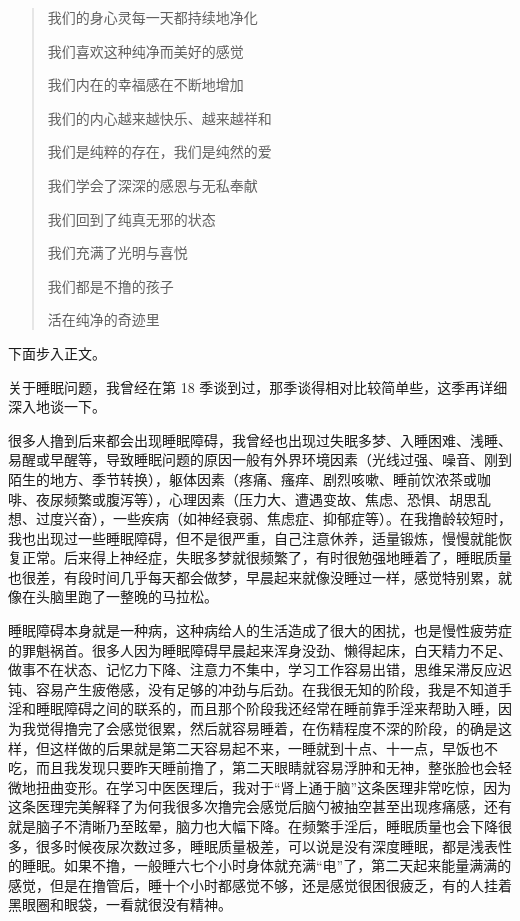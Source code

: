 \begin{case}
\begin{quotation}
        我们的身心灵每一天都持续地净化

        我们喜欢这种纯净而美好的感觉

        我们内在的幸福感在不断地增加

        我们的内心越来越快乐、越来越祥和

        我们是纯粹的存在，我们是纯然的爱

        我们学会了深深的感恩与无私奉献

        我们回到了纯真无邪的状态

        我们充满了光明与喜悦

        我们都是不撸的孩子

        活在纯净的奇迹里
    \end{quotation}
\end{case}

下面步入正文。

关于睡眠问题，我曾经在第 18 季谈到过，那季谈得相对比较简单些，这季再详细深入地谈一下。

很多人撸到后来都会出现睡眠障碍，我曾经也出现过失眠多梦、入睡困难、浅睡、易醒或早醒等，导致睡眠问题的原因一般有外界环境因素（光线过强、噪音、刚到陌生的地方、季节转换），躯体因素（疼痛、瘙痒、剧烈咳嗽、睡前饮浓茶或咖啡、夜尿频繁或腹泻等），心理因素（压力大、遭遇变故、焦虑、恐惧、胡思乱想、过度兴奋），一些疾病（如神经衰弱、焦虑症、抑郁症等）。在我撸龄较短时，我也出现过一些睡眠障碍，但不是很严重，自己注意休养，适量锻炼，慢慢就能恢复正常。后来得上神经症，失眠多梦就很频繁了，有时很勉强地睡着了，睡眠质量也很差，有段时间几乎每天都会做梦，早晨起来就像没睡过一样，感觉特别累，就像在头脑里跑了一整晚的马拉松。

睡眠障碍本身就是一种病，这种病给人的生活造成了很大的困扰，也是慢性疲劳症的罪魁祸首。很多人因为睡眠障碍早晨起来浑身没劲、懒得起床，白天精力不足、做事不在状态、记忆力下降、注意力不集中，学习工作容易出错，思维呆滞反应迟钝、容易产生疲倦感，没有足够的冲劲与后劲。在我很无知的阶段，我是不知道手淫和睡眠障碍之间的联系的，而且那个阶段我还经常在睡前靠手淫来帮助入睡，因为我觉得撸完了会感觉很累，然后就容易睡着，在伤精程度不深的阶段，的确是这样，但这样做的后果就是第二天容易起不来，一睡就到十点、十一点，早饭也不吃，而且我发现只要昨天睡前撸了，第二天眼睛就容易浮肿和无神，整张脸也会轻微地扭曲变形。在学习中医医理后，我对于“肾上通于脑”这条医理非常吃惊，因为这条医理完美解释了为何我很多次撸完会感觉后脑勺被抽空甚至出现疼痛感，还有就是脑子不清晰乃至眩晕，脑力也大幅下降。在频繁手淫后，睡眠质量也会下降很多，很多时候夜尿次数过多，睡眠质量极差，可以说是没有深度睡眠，都是浅表性的睡眠。如果不撸，一般睡六七个小时身体就充满“电”了，第二天起来能量满满的感觉，但是在撸管后，睡十个小时都感觉不够，还是感觉很困很疲乏，有的人挂着黑眼圈和眼袋，一看就很没有精神。

